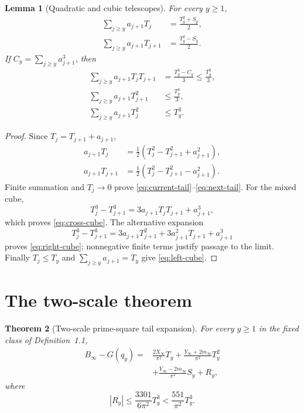 \documentclass[11pt]{article}
\newtheorem{theorem}{Theorem}[section]
\newtheorem{lemma}[theorem]{Lemma}
\theoremstyle{definition}
\theoremstyle{remark}
\begin{document}
\begin{lemma}[Quadratic and cubic telescopes]
\label{lem:tail-algebra}
For every $y\ge1$,
\begin{align}
 \sum_{j\ge y}a_{j+1}T_j
 &=\frac{T_y^2+S_y}{2},
 \label{eq:current-tail}\\
 \sum_{j\ge y}a_{j+1}T_{j+1}
 &=\frac{T_y^2-S_y}{2}.
 \label{eq:next-tail}
\end{align}
If $C_y=\sum_{j\ge y}a_{j+1}^3$, then
\begin{align}
 \sum_{j\ge y}a_{j+1}T_jT_{j+1}
 &=\frac{T_y^3-C_y}{3}\le\frac{T_y^3}{3},
 \label{eq:cross-cube}\\
 \sum_{j\ge y}a_{j+1}T_{j+1}^2
 &\le\frac{T_y^3}{3},
 \label{eq:right-cube}\\
 \sum_{j\ge y}a_{j+1}T_j^2&\le T_y^3.
 \label{eq:left-cube}
\end{align}
\end{lemma}

\begin{proof}
Since $T_j=T_{j+1}+a_{j+1}$,
\begin{align*}
 a_{j+1}T_j
 &=\tfrac12(T_j^2-T_{j+1}^2+a_{j+1}^2),\\
 a_{j+1}T_{j+1}
 &=\tfrac12(T_j^2-T_{j+1}^2-a_{j+1}^2).
\end{align*}
Finite summation and $T_j\to0$ prove
\eqref{eq:current-tail}--\eqref{eq:next-tail}.  For the mixed cube,
\[
 T_j^3-T_{j+1}^3
 =3a_{j+1}T_jT_{j+1}+a_{j+1}^3,
\]
which proves \eqref{eq:cross-cube}.  The alternative expansion
\[
 T_j^3-T_{j+1}^3
 =3a_{j+1}T_{j+1}^2+3a_{j+1}^2T_{j+1}+a_{j+1}^3
\]
proves \eqref{eq:right-cube}; nonnegative finite terms justify passage to
the limit.  Finally $T_j\le T_y$ and $\sum_{j\ge y}a_{j+1}=T_y$ give
\eqref{eq:left-cube}.
\end{proof}

\section{The two-scale theorem}

\begin{theorem}[Two-scale prime-square tail expansion]
\label{thm:two-scale}
For every $y\ge1$ in the fixed class of Definition~1.1,
\begin{equation}
\boxed{\begin{aligned}
B_\infty-G(q_y)
={}&\frac{2X_\infty}{\pi^2}T_y
+\frac{Y_\infty+2m_\infty}{\pi^2}T_y^2\\
&+\frac{Y_\infty-2m_\infty}{\pi^2}S_y+R_y,
\end{aligned}}
\label{eq:two-scale}
\end{equation}
where
\begin{equation}
 \boxed{|R_y|\le\frac{3301}{6\pi^2}T_y^3
 <\frac{551}{\pi^2}T_y^3.}
 \label{eq:cubic-bound}
\end{equation}
\end{theorem}
\end{document}
